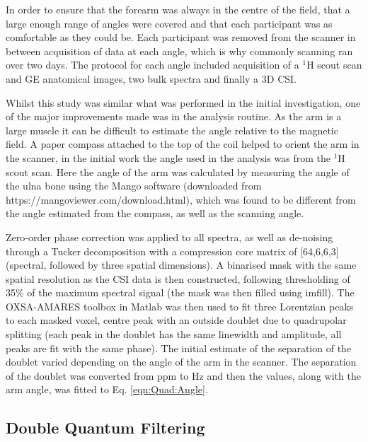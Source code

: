 In order to ensure that the forearm was always in the centre of the field, that a large enough range of angles were covered and that each participant was as comfortable as they could be. Each participant was removed from the scanner in between acquisition of data at each angle, which is why commonly scanning ran over two days. The protocol for each angle included  acquisition of a $^1$H scout scan and \ac{GE} anatomical images, two bulk spectra and finally a 3D \ac{CSI}. 

Whilst this study was similar what was performed in the initial investigation, one of the major improvements made was in the analysis routine. As the arm is a large muscle it can be difficult to estimate the angle relative to the magnetic field. A paper compass attached to the top of the coil helped to orient the arm in the scanner, in the initial work the angle used in the analysis was from the $^1$H scout scan. Here the angle of the arm was calculated by measuring the angle of the ulna bone using the Mango software (downloaded from https://mangoviewer.com/download.html), which was found to be different from the angle estimated from the compass, as well as the scanning angle.

Zero-order phase correction was applied to all spectra, as well as de-noising through a Tucker decomposition \cite{Bader2007EfficientTensors} with a compression core matrix of [64,6,6,3] (spectral, followed by three spatial dimensions). A binarised mask with the same spatial resolution as the \ac{CSI} data is then constructed, following thresholding of 35\% of the maximum spectral signal (the mask was then filled using imfill). The OXSA-AMARES \cite{Purvis2017OXSA:MATLAB} toolbox in Matlab was then used to fit three Lorentzian peaks to each masked voxel, centre peak with an outside doublet due to quadrupolar splitting (each peak in the doublet has the same linewidth and amplitude, all peaks are fit with the same phase). The initial estimate of the separation of the doublet varied depending on the angle of the arm in the scanner. The separation of the doublet was converted from ppm to Hz and then the values, along with the arm angle, was fitted to Eq. \ref{eqn:Quad:Angle}.

\subsection{Double Quantum Filtering}

